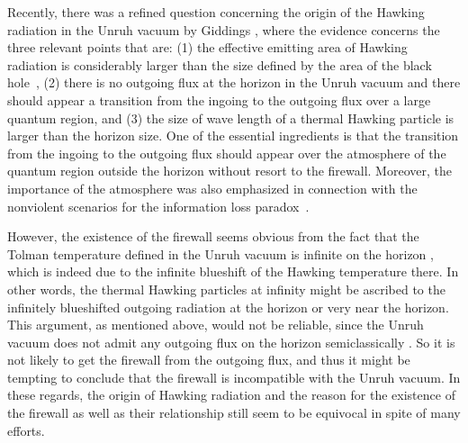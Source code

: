 \documentclass[aps,a4paper,showpacs,showkeys,superscriptaddress,12pt]{revtex4-1}
\begin{document}
Recently,
there was a refined question concerning the origin of the Hawking radiation in the Unruh vacuum
by Giddings \cite{Giddings:2015uzr},
where the evidence concerns the three relevant points that are: (1) the effective emitting area of Hawking radiation is
considerably larger than the size defined by the area of the black hole~\cite{Page:1976df},
(2) there is no outgoing flux at the horizon in the Unruh vacuum
and there should appear a transition from the ingoing to the outgoing flux
over a large quantum region, and
(3) the size of wave length of a thermal Hawking particle is larger than
the horizon size.
One of the essential ingredients is that
the transition from the ingoing to the outgoing flux should appear over the atmosphere of
the quantum region outside the horizon
without resort to the firewall.
Moreover, the importance of
the atmosphere
was also emphasized in connection with the nonviolent scenarios
for the information loss paradox~\cite{Giddings:2006sj}.

However, the existence of the firewall seems obvious
from the fact that the Tolman temperature defined in the Unruh vacuum
is infinite on the horizon \cite{Tolman:1930zza},
which is indeed due to the infinite blueshift of the Hawking temperature there.
In other words, the thermal Hawking particles at infinity
might be ascribed to the infinitely blueshifted outgoing radiation at the horizon or very
near the horizon.
This argument, as mentioned above, would not be reliable, since the Unruh vacuum
does not admit any outgoing flux on the horizon semiclassically \cite{Unruh:1976db}.
So it is not likely to get the firewall from the outgoing flux, and thus
it might be tempting to conclude
that the firewall is incompatible with the Unruh vacuum.
In these regards, the origin of Hawking radiation and the reason for the
existence of the firewall as well as their relationship
still seem to be equivocal in spite of many efforts.
\end{document}
